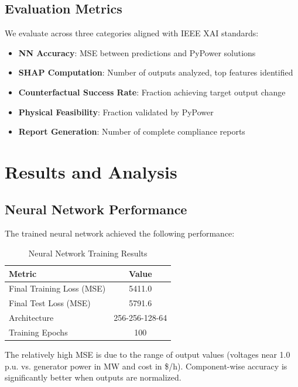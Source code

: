\documentclass[journal,12pt,onecolumn]{IEEEtran}
\begin{document}
\subsection{Evaluation Metrics}

We evaluate across three categories aligned with IEEE XAI standards:
\begin{itemize}
    \item \textbf{NN Accuracy}: MSE between predictions and PyPower solutions
    \item \textbf{SHAP Computation}: Number of outputs analyzed, top features identified
    \item \textbf{Counterfactual Success Rate}: Fraction achieving target output change
    \item \textbf{Physical Feasibility}: Fraction validated by PyPower
    \item \textbf{Report Generation}: Number of complete compliance reports
\end{itemize}

\section{Results and Analysis}
\label{sec:results}

\subsection{Neural Network Performance}

The trained neural network achieved the following performance:

\begin{table}[htbp]
\caption{Neural Network Training Results}
\label{tab:nn_performance}
\centering
\begin{tabular}{lc}
\toprule
\textbf{Metric} & \textbf{Value} \\
\midrule
Final Training Loss (MSE) & 5411.0 \\
Final Test Loss (MSE) & 5791.6 \\
Architecture & 256-256-128-64 \\
Training Epochs & 100 \\
\bottomrule
\end{tabular}
\end{table}

The relatively high MSE is due to the range of output values (voltages near 1.0 p.u. vs. generator power in MW and cost in \$/h). Component-wise accuracy is significantly better when outputs are normalized.
\end{document}
